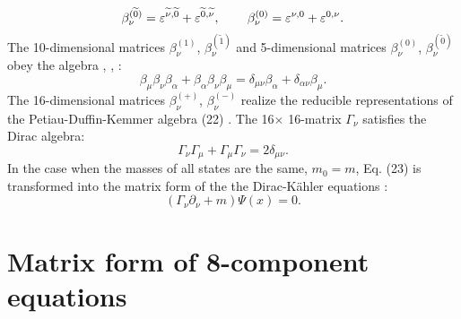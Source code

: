 \documentclass[a4paper,12pt]{article}
\begin{document}
\[
\beta _\nu ^{(\widetilde{0})}=\varepsilon ^{\widetilde{\nu
},\widetilde{0} }+\varepsilon ^{\widetilde{0},\widetilde{\nu }} ,
\hspace{0.3in}\beta _\nu ^{(0)}=\varepsilon ^{\nu ,0}+\varepsilon
^{0,\nu } .
\]
The 10-dimensional matrices $\beta _\nu ^{(1)}$, $\beta _\nu
^{(\widetilde{1})}$ and 5-dimensional matrices $\beta _\nu
^{(0)}$, $\beta _\nu ^{(\widetilde{0})}$ obey the algebra
\cite{Petiau}, \cite{Duffin}, \cite{Kemmer}:
\begin{equation}
\beta _\mu\beta _\nu \beta _\alpha +\beta _\alpha \beta _\nu \beta
_\mu =\delta _{\mu \nu }\beta _\alpha +\delta _{\alpha \nu }\beta
_\mu  .\label{22}
\end{equation}
The 16-dimensional matrices $\beta _\nu ^{(+)}$, $\beta _\nu
^{(-)}$ realize the reducible representations of the
Petiau-Duffin-Kemmer algebra (22) \cite{Borgardt}. The 16$\times$
16-matrix $\Gamma _\nu $ satisfies the Dirac algebra:
\begin{equation}
\Gamma _\nu \Gamma _\mu +\Gamma _\mu \Gamma _\nu =2\delta _{\mu
\nu } .\label{23}
\end{equation}
In the case when the masses of all states are the same, $m_0=m$,
Eq. (23) is transformed into the matrix form of the the
Dirac-K\"ahler equations \cite{Kruglov1}:
\begin{equation}
\left( \Gamma _\nu \partial _\nu +m\right) \Psi (x)=0 .\label{24}
\end{equation}

\section{Matrix form of 8-component equations}
\end{document}
